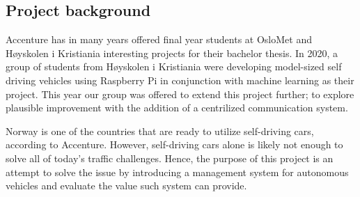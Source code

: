 \subsection{Project background}
%
%

Accenture has in many years offered final year students at OsloMet and Høyskolen i Kristiania interesting projects for their bachelor thesis. In 2020, a group of students from Høyskolen i Kristiania were developing model-sized self driving vehicles using Raspberry Pi in conjunction with machine learning as their project. This year our group was offered to extend this project further; to explore plausible improvement with the addition of a centrilized communication system.

Norway is one of the countries that are ready to utilize self-driving cars, according to Accenture. However, self-driving cars alone is likely not enough to solve all of today's traffic challenges. Hence, the purpose of this project is an attempt to solve the issue by introducing a management system for autonomous vehicles and evaluate the value such system can provide.